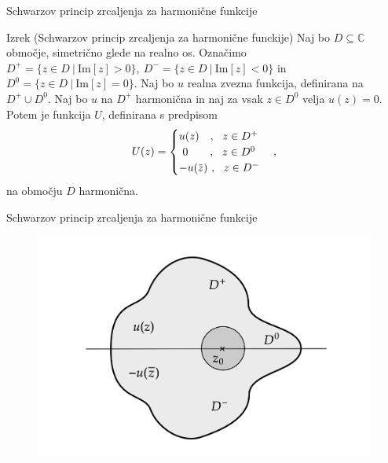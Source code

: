 \documentclass{beamer}
\newcommand{\overbar}[1]{\mkern 1.5mu\overline{\mkern-1.5mu#1\mkern-1.5mu}\mkern 1.5mu}
\theoremstyle{definition}
\theoremstyle{definition}
\begin{document}
\begin{frame}{Schwarzov princip zrcaljenja za harmonične funkcije}
    \begin{exampleblock}{Izrek (Schwarzov princip zrcaljenja za harmonične funckije)}
        Naj bo $D \subseteq \mathbb{C}$ območje, simetrično glede na realno os. 
        Označimo $D^{+} = \{z \in D~|~\text{Im}[z] > 0\},~D^{-} = \{z \in D~|~\text{Im}[z] < 0\}$ in $D^{0} = \{z \in D~|~\text{Im}[z] = 0\}$.
        Naj bo $u$ realna zvezna funkcija, definirana na $D^{+} \cup D^0$. Naj bo $u$ na $D^{+}$ harmonična in naj za vsak $z \in D^0$ velja $u(z) = 0$.
        Potem je funkcija $U$, definirana s predpisom
        $$
        U(z) = 
        \begin{cases}
            u(z)~~~,~~z \in D^{+}\\
            ~0~~~~~~,~~z \in D^0\\
            -u(\overbar{z})~,~~z \in D^{-}
        \end{cases},
        $$
        na območju $D$ harmonična.
    \end{exampleblock}
\end{frame}

\begin{frame}{Schwarzov princip zrcaljenja za harmonične funkcije}
   \begin{figure}
   \begin{center}
      \includegraphics[width=\textwidth]{schwarz_harm.png}
   \end{center}
   \end{figure}
\end{frame}
\end{document}
